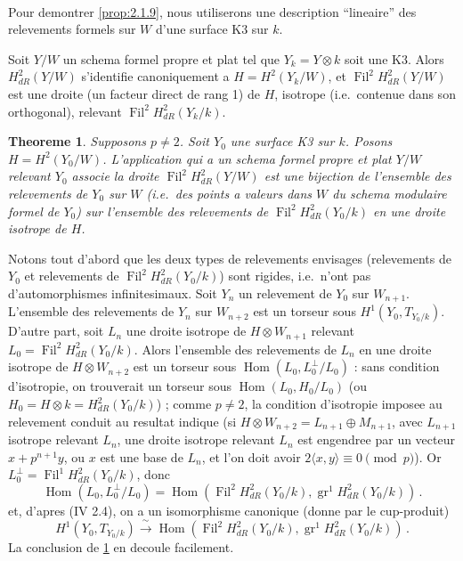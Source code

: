 \documentclass[12pt,a4paper]{article}
\theoremstyle{plain}
\newtheorem{theorem}{Theoreme}[section]
\theoremstyle{definition}
\theoremstyle{remark}
\DeclareMathOperator{\Hom}{Hom}
\DeclareMathOperator{\gr}{gr}
\DeclareMathOperator{\Fil}{Fil}
\begin{document}
\paragraph{}

Pour demontrer \ref{prop:2.1.9}, nous utiliserons une description ``lineaire'' des relevements formels sur $W$ d'une surface K3 sur $k$.

Soit $Y/W$ un schema formel propre et plat tel que $Y_k = Y \otimes k$ soit une K3. Alors $H_{dR}^2(Y/W)$ s'identifie canoniquement a $H = H^2(Y_k/W)$, et $\Fil^2H_{dR}^2(Y/W)$ est une droite (un facteur direct de rang 1) de $H$, isotrope (i.e.\ contenue dans son orthogonal), relevant $\Fil^2H_{dR}^2(Y_k/k)$.

\begin{theorem}\label{thm:2.1.11}
Supposons $p \neq 2$. Soit $Y_0$ une surface K3 sur $k$. Posons $H = H^2(Y_0/W)$. L'application qui a un schema formel propre et plat $Y/W$ relevant $Y_0$ associe la droite $\Fil^2H_{dR}^2(Y/W)$ est une bijection de l'ensemble des relevements de $Y_0$ sur $W$ (i.e.\ des points a valeurs dans $W$ du schema modulaire formel de $Y_0$) sur l'ensemble des relevements de $\Fil^2H_{dR}^2(Y_0/k)$ en une droite isotrope de $H$.
\end{theorem}

Notons tout d'abord que les deux types de relevements envisages (relevements de $Y_0$ et relevements de $\Fil^2H_{dR}^2(Y_0/k)$) sont rigides, i.e.\ n'ont pas d'automorphismes infinitesimaux. Soit $Y_n$ un relevement de $Y_0$ sur $W_{n+1}$. L'ensemble des relevements de $Y_n$ sur $W_{n+2}$ est un torseur sous $H^1(Y_0, T_{Y_0/k})$. D'autre part, soit $L_n$ une droite isotrope de $H \otimes W_{n+1}$ relevant $L_0 = \Fil^2H_{dR}^2(Y_0/k)$. Alors l'ensemble des relevements de $L_n$ en une droite isotrope de $H \otimes W_{n+2}$ est un torseur sous $\Hom(L_0, L_0^\perp/L_0)$ : sans condition d'isotropie, on trouverait un torseur sous $\Hom(L_0, H_0/L_0)$ (ou $H_0 = H \otimes k = H_{dR}^2(Y_0/k)$) ; comme $p \neq 2$, la condition d'isotropie imposee au relevement conduit au resultat indique (si $H \otimes W_{n+2} = L_{n+1} \oplus M_{n+1}$, avec $L_{n+1}$ isotrope relevant $L_n$, une droite isotrope relevant $L_n$ est engendree par un vecteur $x + p^{n+1}y$, ou $x$ est une base de $L_n$, et l'on doit avoir $2\langle x, y\rangle \equiv 0 \pmod{p}$). Or $L_0^\perp = \Fil^1H_{dR}^2(Y_0/k)$, donc
\[
\Hom(L_0, L_0^\perp/L_0) = \Hom(\Fil^2H_{dR}^2(Y_0/k), \gr^1H_{dR}^2(Y_0/k))\,.\]
et, d'apres (IV 2.4), on a un isomorphisme canonique (donne par le cup-produit)
\[
H^1(Y_0, T_{Y_0/k}) \xrightarrow{\;\sim\;} \Hom(\Fil^2H_{dR}^2(Y_0/k), \gr^1H_{dR}^2(Y_0/k))\,.\]
La conclusion de \ref{thm:2.1.11} en decoule facilement.
\end{document}
